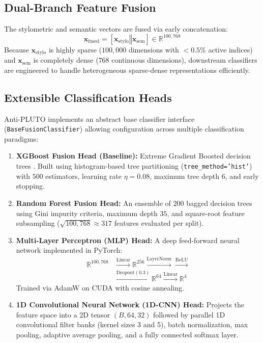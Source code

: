 \documentclass[journal]{IEEEtran}
\begin{document}
\subsection{Dual-Branch Feature Fusion}
The stylometric and semantic vectors are fused via early concatenation:
\begin{equation}
    \mathbf{x}_{\text{fused}} = [\mathbf{x}_{\text{stylo}} \mathbin{\Vert} \mathbf{x}_{\text{sem}}] \in \mathbb{R}^{100,768}
\end{equation}
Because $\mathbf{x}_{\text{stylo}}$ is highly sparse ($100,000$ dimensions with $<0.5\%$ active indices) and $\mathbf{x}_{\text{sem}}$ is completely dense ($768$ continuous dimensions), downstream classifiers are engineered to handle heterogeneous sparse-dense representations efficiently.

\subsection{Extensible Classification Heads}
Anti-PLUTO implements an abstract base classifier interface (\texttt{BaseFusionClassifier}) allowing configuration across multiple classification paradigms:
\begin{enumerate}
    \item \textbf{XGBoost Fusion Head (Baseline):} Extreme Gradient Boosted decision trees \cite{chen2016xgboost}. Built using histogram-based tree partitioning (\texttt{tree\_method='hist'}) with $500$ estimators, learning rate $\eta = 0.08$, maximum tree depth $6$, and early stopping.
    \item \textbf{Random Forest Fusion Head:} An ensemble of $200$ bagged decision trees \cite{breiman2001random} using Gini impurity criteria, maximum depth $35$, and square-root feature subsampling ($\sqrt{100,768} \approx 317$ features evaluated per split).
    \item \textbf{Multi-Layer Perceptron (MLP) Head:} A deep feed-forward neural network implemented in PyTorch:
    \begin{equation*}
    \begin{aligned}
        \mathbb{R}^{100,768} &\xrightarrow{\text{Linear}} \mathbb{R}^{256} \xrightarrow{\text{LayerNorm}} \xrightarrow{\text{ReLU}} \\
        &\xrightarrow{\text{Dropout}(0.3)} \mathbb{R}^{64} \xrightarrow{\text{Linear}} \mathbb{R}^4
    \end{aligned}
    \end{equation*}
    Trained via AdamW on CUDA with cosine annealing.
    \item \textbf{1D Convolutional Neural Network (1D-CNN) Head:} Projects the feature space into a 2D tensor $(B, 64, 32)$ followed by parallel 1D convolutional filter banks (kernel sizes 3 and 5), batch normalization, max pooling, adaptive average pooling, and a fully connected softmax layer.
\end{enumerate}
\end{document}
